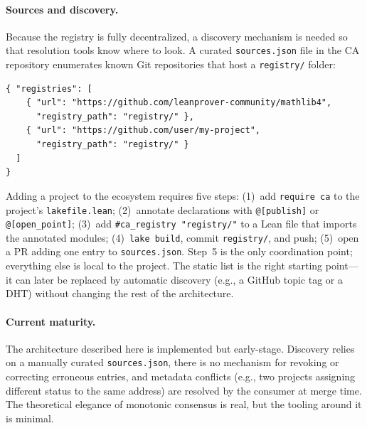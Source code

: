 \paragraph{Sources and discovery.}
Because the registry is fully decentralized, a discovery mechanism is
needed so that resolution tools know where to look.  A curated
\texttt{sources.json} file in the CA repository enumerates known Git
repositories that host a \texttt{registry/} folder:

\begin{lstlisting}[style=json,caption={\texttt{sources.json} format}]
{ "registries": [
    { "url": "https://github.com/leanprover-community/mathlib4",
      "registry_path": "registry/" },
    { "url": "https://github.com/user/my-project",
      "registry_path": "registry/" }
  ]
}
\end{lstlisting}

Adding a project to the ecosystem requires five steps: (1)~add
\texttt{require ca} to the project's \texttt{lakefile.lean};
(2)~annotate declarations with \texttt{@[publish]} or
\texttt{@[open\_point]}; (3)~add \texttt{\#ca\_registry "registry/"}
to a Lean file that imports the annotated modules;
(4)~\texttt{lake build}, commit \texttt{registry/}, and push;
(5)~open a PR adding one entry to \texttt{sources.json}.
Step~5 is the only coordination point; everything else is local to the
project.  The static list is the right starting point---it can later be
replaced by automatic discovery (e.g., a GitHub topic tag or a DHT)
without changing the rest of the architecture.

\paragraph{Current maturity.}  The architecture described here is
implemented but early-stage.  Discovery relies on a manually curated
\texttt{sources.json}, there is no mechanism for revoking or correcting
erroneous entries, and metadata conflicts (e.g., two projects assigning
different status to the same address) are resolved by the consumer at
merge time.  The theoretical elegance of monotonic consensus is real,
but the tooling around it is minimal.


